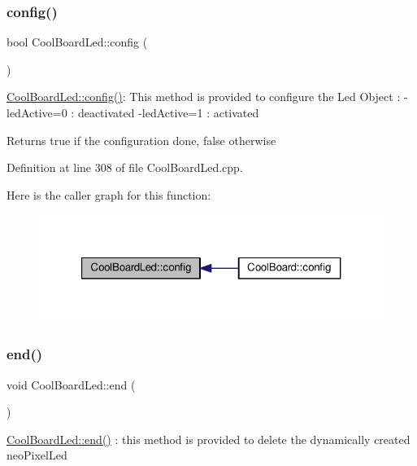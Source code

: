 \subsubsection{\texorpdfstring{config()}{config()}}
{\footnotesize\ttfamily bool Cool\+Board\+Led\+::config (\begin{DoxyParamCaption}{ }\end{DoxyParamCaption})}

\hyperlink{class_cool_board_led_a1b60e5e30bea96c49ed62ed1bf1ffc8b}{Cool\+Board\+Led\+::config()}\+: This method is provided to configure the Led Object \+: -\/led\+Active=0 \+: deactivated -\/led\+Active=1 \+: activated \begin{DoxyReturn}{Returns}
true if the configuration done, false otherwise 
\end{DoxyReturn}


Definition at line 308 of file Cool\+Board\+Led.\+cpp.

Here is the caller graph for this function\+:\nopagebreak
\begin{figure}[H]
\begin{center}
\leavevmode
\includegraphics[width=321pt]{class_cool_board_led_a1b60e5e30bea96c49ed62ed1bf1ffc8b_icgraph}
\end{center}
\end{figure}
\mbox{\label{class_cool_board_led_a69f323359e0c9f797422f2152b5d41ef}} 
\subsubsection{\texorpdfstring{end()}{end()}}
{\footnotesize\ttfamily void Cool\+Board\+Led\+::end (\begin{DoxyParamCaption}{ }\end{DoxyParamCaption})}

\hyperlink{class_cool_board_led_a69f323359e0c9f797422f2152b5d41ef}{Cool\+Board\+Led\+::end()} \+: this method is provided to delete the dynamically created neo\+Pixel\+Led 

